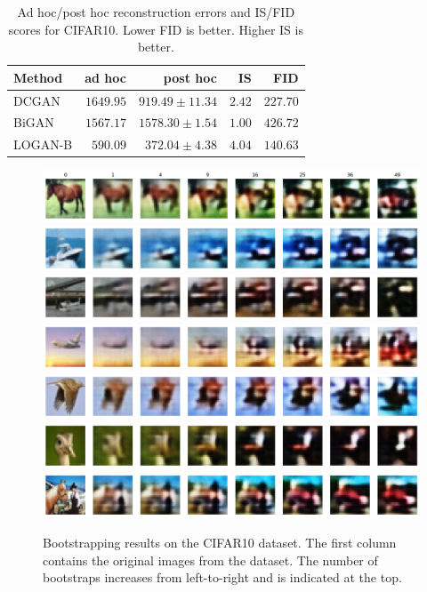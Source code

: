 \documentclass[10pt,twocolumn,letterpaper]{article}
\begin{document}
\begin{table}[!ht]
    \centering
    \begin{tabular}{lrrrr}
        Method & ad hoc & post hoc & IS & FID\\\hline
        DCGAN   & $1649.95$ & $919.49 \pm 11.34$ & $2.42$ & $227.70$ \\
        BiGAN   & $1567.17$ & $1578.30 \pm 1.54$ & $1.00$ & $426.72$ \\
        LOGAN-B & $590.09$  &  $372.04 \pm 4.38$ & $4.04$ & $140.63$ \\
    \end{tabular}
    \caption{Ad hoc/post hoc reconstruction errors and IS/FID scores for CIFAR10. Lower FID is better. Higher IS is better.}
    \label{tab:cifar10_err}
\end{table}

\begin{figure}
    \centering
    \includegraphics[width=\linewidth]{bootstrap/logan-b_1.png}
    \includegraphics[width=\linewidth]{bootstrap/logan-b_2.png}
    \includegraphics[width=\linewidth]{bootstrap/logan-b_3.png}
    \includegraphics[width=\linewidth]{bootstrap/logan-b_4.png}
    \includegraphics[width=\linewidth]{bootstrap/logan-b_5.png}
    \includegraphics[width=\linewidth]{bootstrap/logan-b_6.png}
    \includegraphics[width=\linewidth]{bootstrap/logan-b_7.png}
    \caption{Bootstrapping results on the CIFAR10 dataset. The first column contains the original images from the dataset. The number of bootstraps increases from left-to-right and is indicated at the top.}
    \label{fig:bootstrap_results}
\end{figure}
\end{document}

